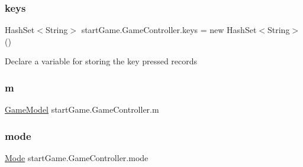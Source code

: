 \hypertarget{classstart_game_1_1_game_controller_afed267a642ca7f3ec1c1074fec2996dd}{}\label{classstart_game_1_1_game_controller_afed267a642ca7f3ec1c1074fec2996dd} 
\subsubsection{\texorpdfstring{keys}{keys}}
{\footnotesize\ttfamily Hash\+Set$<$String$>$ start\+Game.\+Game\+Controller.\+keys = new Hash\+Set$<$String$>$()\hspace{0.3cm}{\ttfamily [private]}}

Declare a variable for storing the key pressed records \hypertarget{classstart_game_1_1_game_controller_a2c79234f85f979b8f1efe5a48893560d}{}\label{classstart_game_1_1_game_controller_a2c79234f85f979b8f1efe5a48893560d} 
\subsubsection{\texorpdfstring{m}{m}}
{\footnotesize\ttfamily \hyperlink{classmodel_1_1_game_model}{Game\+Model} start\+Game.\+Game\+Controller.\+m\hspace{0.3cm}{\ttfamily [private]}}

\hypertarget{classstart_game_1_1_game_controller_ad46f15cbc3846c80495ca340b3b1dedc}{}\label{classstart_game_1_1_game_controller_ad46f15cbc3846c80495ca340b3b1dedc} 
\subsubsection{\texorpdfstring{mode}{mode}}
{\footnotesize\ttfamily \hyperlink{classview_1_1_mode}{Mode} start\+Game.\+Game\+Controller.\+mode\hspace{0.3cm}{\ttfamily [private]}}

\hypertarget{classstart_game_1_1_game_controller_a4dc3f50458dc835c6fa67be53fd1751b}{}\label{classstart_game_1_1_game_controller_a4dc3f50458dc835c6fa67be53fd1751b} 
